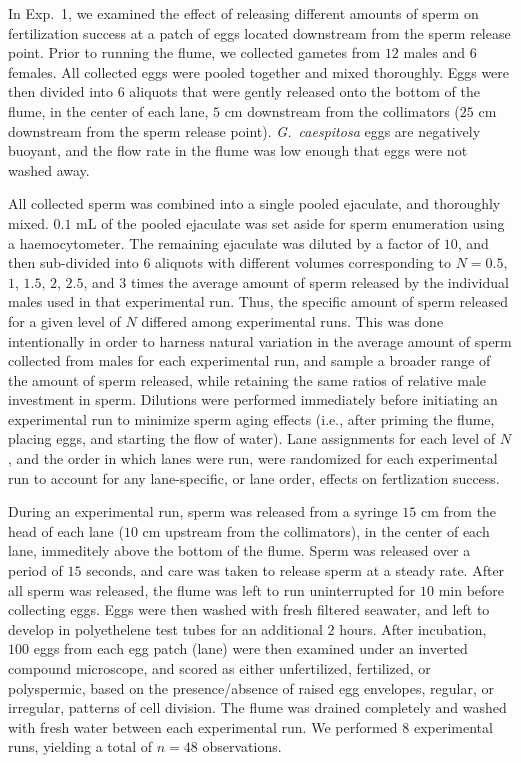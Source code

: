 \documentclass{article}
\begin{document}
	In Exp.~1, we examined the effect of releasing different amounts of sperm on fertilization success at a patch of eggs located downstream from the sperm release point. Prior to running the flume, we collected gametes from $12$ males and $6$ females. All collected eggs were pooled together and mixed thoroughly. Eggs were then divided into $6$ aliquots that were gently released onto the bottom of the flume, in the center of each lane, $5$ cm downstream from the collimators ($25$ cm downstream from the sperm release point). \textit{G.~caespitosa} eggs are negatively buoyant, and the flow rate in the flume was low enough that eggs were not washed away. 

	All collected sperm was combined into a single pooled ejaculate, and thoroughly mixed. $0.1$ mL of the pooled ejaculate was set aside for sperm enumeration using a haemocytometer. The remaining ejaculate was diluted by a factor of $10$, and then sub-divided into $6$ aliquots with different volumes corresponding to $N = 0.5$, $1$, $1.5$, $2$, $2.5$, and $3$ times the average amount of sperm released by the individual males used in that experimental run. Thus, the specific amount of sperm released for a given level of $N$ differed among experimental runs. This was done intentionally in order to harness natural variation in the average amount of sperm collected from males for each experimental run, and sample a broader range of the amount of sperm released, while retaining the same ratios of relative male investment in sperm. Dilutions were performed immediately before initiating an experimental run to minimize sperm aging effects (i.e., after priming the flume, placing eggs, and starting the flow of water). Lane assignments for each level of $N$, and the order in which lanes were run, were randomized for each experimental run to account for any lane-specific, or lane order, effects on fertlization success. 

	During an experimental run, sperm was released from a syringe $15$ cm from the head of each lane ($10$ cm upstream from the collimators), in the center of each lane, immeditely above the bottom of the flume. Sperm was released over a period of $15$ seconds, and care was taken to release sperm at a steady rate. After all sperm was released, the flume was left to run uninterrupted for $10$ min before collecting eggs. Eggs were then washed with fresh filtered seawater, and left to develop in polyethelene test tubes for an additional $2$ hours. After incubation, $100$ eggs from each egg patch (lane) were then examined under an inverted compound microscope, and scored as either unfertilized, fertilized, or polyspermic, based on the presence/absence of raised egg envelopes, regular, or irregular, patterns of cell division. The flume was drained completely and washed with fresh water between each experimental run. We performed $8$ experimental runs, yielding a total of $n=48$ observations.
\end{document}
